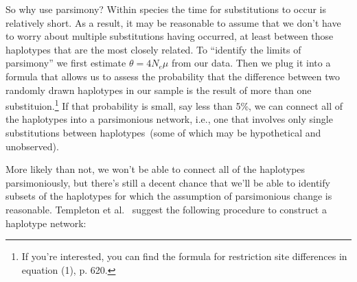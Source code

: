 \documentclass[12pt]{article}
\begin{document}
So why use parsimony? Within species the time for substitutions to
occur is relatively short. As a result, it may be reasonable to assume
that we don't have to worry about multiple substitutions having
occurred, at least between those haplotypes that are the most closely
related. To ``identify the limits of parsimony'' we first estimate
$\theta=4N_e\mu$ from our data. Then we plug it into a formula that
allows us to assess the probability that the difference between two
randomly drawn haplotypes in our sample is the result of more than one
substituion.\footnote{If you're interested, you can find the formula
  for restriction site differences in equation (1), p. 620.} If that
probability is small, say less than 5\%, we can connect all of the
haplotypes into a parsimonious network, i.e., one that involves only
single substitutions between haplotypes~(some of which may be
hypothetical and unobserved).

More likely than not, we won't be able to connect all of the
haplotypes parsimoniously, but there's still a decent chance that
we'll be able to identify subsets of the haplotypes for which the
assumption of parsimonious change is reasonable. Templeton et
al.~\cite{Templeton-etal-1992} suggest the following procedure to
construct a haplotype network:
\end{document}
